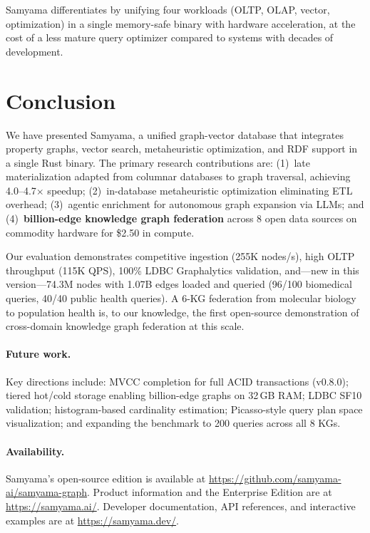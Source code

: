 \documentclass[11pt]{article}
\begin{document}
Samyama differentiates by unifying four workloads (OLTP, OLAP, vector, optimization) in a single memory-safe binary with hardware acceleration, at the cost of a less mature query optimizer compared to systems with decades of development.

\section{Conclusion}

We have presented Samyama, a unified graph-vector database that integrates property graphs, vector search, metaheuristic optimization, and RDF support in a single Rust binary. The primary research contributions are: (1)~late materialization adapted from columnar databases to graph traversal, achieving 4.0--4.7$\times$ speedup; (2)~in-database metaheuristic optimization eliminating ETL overhead; (3)~agentic enrichment for autonomous graph expansion via LLMs; and (4)~\textbf{billion-edge knowledge graph federation} across 8 open data sources on commodity hardware for \$2.50 in compute.

Our evaluation demonstrates competitive ingestion (255K nodes/s), high OLTP throughput (115K QPS), 100\% LDBC Graphalytics validation, and---new in this version---74.3M nodes with 1.07B edges loaded and queried (96/100 biomedical queries, 40/40 public health queries). A 6-KG federation from molecular biology to population health is, to our knowledge, the first open-source demonstration of cross-domain knowledge graph federation at this scale.

\paragraph{Future work.} Key directions include: MVCC completion for full ACID transactions (v0.8.0); tiered hot/cold storage enabling billion-edge graphs on 32\,GB RAM; LDBC SF10 validation; histogram-based cardinality estimation; Picasso-style query plan space visualization; and expanding the benchmark to 200 queries across all 8 KGs.

\paragraph{Availability.} Samyama's open-source edition is available at \url{https://github.com/samyama-ai/samyama-graph}. Product information and the Enterprise Edition are at \url{https://samyama.ai/}. Developer documentation, API references, and interactive examples are at \url{https://samyama.dev/}.



\end{document}
